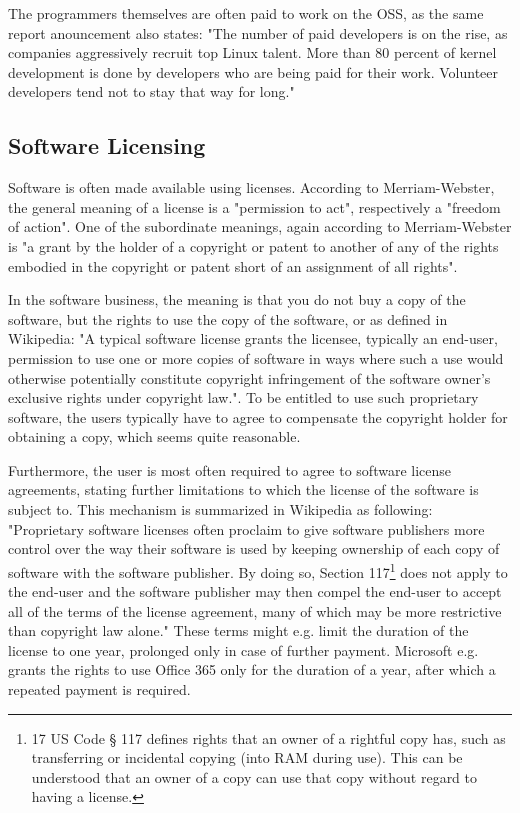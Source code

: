 \documentclass[a4paper]{report}
\begin{document}
The programmers themselves are often paid to work on the OSS, as the same report anouncement also states: "The number of paid developers is on the rise, as companies aggressively recruit top Linux talent. More than 80 percent of kernel development is done by developers who are being paid for their work. Volunteer developers tend not to stay that way for long."

\subsection{Software Licensing}
\label{ssec:SLic}
Software is often made available using licenses. According to Merriam-Webster, the general meaning of a license is a "permission to act", respectively a "freedom of action"\parencite{WebstLic}. One of the subordinate meanings, again according to Merriam-Webster is "a grant by the holder of a copyright or patent to another of any of the rights embodied in the copyright or patent short of an assignment of all rights". 

In the software business, the meaning is that you do not buy a copy of the software, but the rights to use the copy of the software, or as defined in Wikipedia: "A typical software license grants the licensee, typically an end-user, permission to use one or more copies of software in ways where such a use would otherwise potentially constitute copyright infringement of the software owner's exclusive rights under copyright law."\parencite{WikiSoftLic}. To be entitled to use such proprietary software, the users typically have to agree to compensate the copyright holder for obtaining a copy, which seems quite reasonable. 

Furthermore, the user is most often required to agree to software license agreements, stating further limitations to which the license of the software is subject to. This mechanism is summarized in Wikipedia as following: "Proprietary software licenses often proclaim to give software publishers more control over the way their software is used by keeping ownership of each copy of software with the software publisher. By doing so, Section 117\footnote{17 US Code § 117 defines rights that an owner of a rightful copy has, such as transferring or incidental copying (into RAM during use). This can be understood that an owner of a copy can use that copy without regard to having a license.} does not apply to the end-user and the software publisher may then compel the end-user to accept all of the terms of the license agreement, many of which may be more restrictive than copyright law alone."\parencite{WikiSoftLic} These terms might e.g. limit the duration of the license to one year, prolonged only in case of further payment. Microsoft e.g. grants the rights to use Office 365 only for the duration of a year, after which a repeated payment is required\parencite{Off365}.
\end{document}
